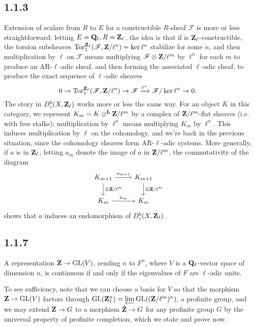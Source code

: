 \documentclass[deligne.tex]{subfiles}
\begin{document}
\subsection*{1.1.3}\label{weilII:1.1.3}
Extension of scalars from $R$ to $E$ for a constructible $R$-sheaf
$\mathscr F$ is
more or less straightforward: letting $E=\mathbf{Q}_\ell,R=\mathbf{Z}_\ell$, the idea is
that if is $\mathbf{Z}_\ell$-constructible, the torsion subsheaves
$\operatorname{Tor}^{\mathbf{Z}_\ell}_1(\mathscr F,\mathbf{Z}/\ell^n)=\ker \ell^n$ stabilize for some
$n$, and then multiplication by $\ell$ on $\mathscr F$ means multiplying
$\mathscr F\otimes\mathbf{Z}/\ell^m$ by $\ell^n$ for each $m$ to produce an
AR-$\ell$-adic sheaf, and then forming the associated $\ell$-adic sheaf,
to produce the exact sequence of $\ell$-adic sheaves
\begin{equation*}
	0\rightarrow\operatorname{Tor}^{\mathbf{Z}_\ell}_1(\mathscr F,\mathbf{Z}/\ell^n)\rightarrow\mathscr F\xrightarrow{\ell^n}\mathscr F/\ker \ell^n\rightarrow0.
\end{equation*}
The story in $D_c^b(X,\mathbf{Z}_\ell)$ works more or less the same way.
For an object $K$ in this category, we represent $K_m=K\otimes^{\mathbf{L}}\mathbf{Z}/\ell^m$
by a complex of $\mathbf{Z}/\ell^m$-flat sheaves (i.e. with free stalks);
multiplication by $\ell^n$ means multiplying $K_m$ by $\ell^n$.
This induces multiplication by $\ell$ on the cohomology, and we're back
in the previous situation, since the cohomology sheaves form
AR-$\ell$-adic systems. More generally, if $a$ is in $\mathbf{Z}_\ell$, letting
$a_m$ denote the image of $a$ in $\mathbf{Z}/\ell^m$, the commutativity of the
diagram
\begin{equation*}\begin{tikzcd}
	K_{m+1}\arrow[r,"a_{m+1}"]\arrow[d,"\otimes\ZZ/\ell^m"]
	&K_{m+1}\arrow[d,"\otimes\ZZ/\ell^m"] \\
	K_m\arrow[r,"a_m"]&K_m
\end{tikzcd}\end{equation*}
shows that $a$ induces an endomorphism of $D_c^b(X,\mathbf{Z}_\ell)$.

\subsection*{1.1.7} A representation $\mathbf{Z}\rightarrow\operatorname{GL}(V)$, sending $n$ to $F^n$,
where $V$ is a $\mathbf{Q}_\ell$-vector space of dimension $n$, is
continuous if and only if the eigenvalues of $F$ are $\ell$-adic units.

To see sufficiency, note that we can choose a basis for $V$ so that
the morphism $\mathbf{Z}\rightarrow\operatorname{GL}(V)$ factors through $\operatorname{GL}(\mathbf{Z}_\ell^n)=
\varprojlim\operatorname{GL}((\mathbf{Z}/\ell^m)^n)$, a profinite group, and we may extend
$\mathbf{Z}\rightarrow G$ to a morphism $\hat{\mathbf{Z}}\rightarrow G$ for any profinite group $G$
by the universal property of profinite completion,
which we state and prove now.
\end{document}
